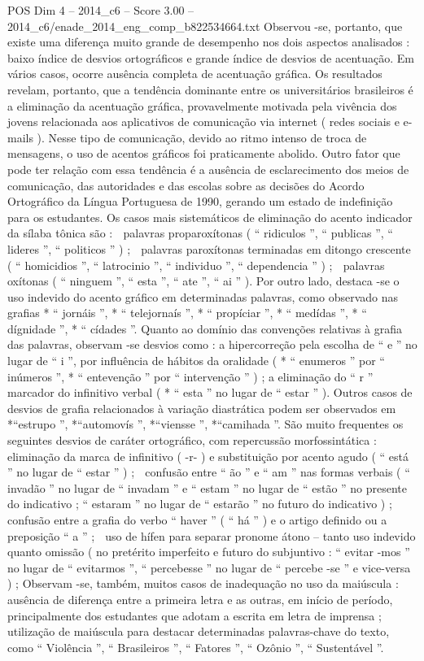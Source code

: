 \begin{textsample}{POS Dim 4 – 2014\_c6 – Score 3.00 – 2014\_c6/enade\_2014\_eng\_comp\_b822534664.txt}
Observou -se, portanto, que existe uma diferença muito grande de desempenho nos dois aspectos analisados : baixo índice de desvios ortográficos e grande índice de desvios de acentuação.
Em vários casos, ocorre ausência completa de acentuação gráfica.
Os resultados revelam, portanto, que a tendência dominante entre os universitários brasileiros é a eliminação da acentuação gráfica, provavelmente motivada pela vivência dos jovens relacionada aos aplicativos de comunicação via internet ( redes sociais e e-mails ).
Nesse tipo de comunicação, devido ao ritmo intenso de troca de mensagens, o uso de acentos gráficos foi praticamente abolido.
Outro fator que pode ter relação com essa tendência é a ausência de esclarecimento dos meios de comunicação, das autoridades e das escolas sobre as decisões do Acordo Ortográfico da Língua Portuguesa de 1990, gerando um estado de indefinição para os estudantes.
Os casos mais sistemáticos de eliminação do acento indicador da sílaba tônica são :  palavras proparoxítonas ( “ ridiculos ”, “ publicas ”, “ lideres ”, “ politicos ” ) ;  palavras paroxítonas terminadas em ditongo crescente ( “ homicidios ”, “ latrocinio ”, “ individuo ”, “ dependencia ” ) ;  palavras oxítonas ( “ ninguem ”, “ esta ”, “ ate ”, “ ai ” ).
Por outro lado, destaca -se o uso indevido do acento gráfico em determinadas palavras, como observado nas grafias * “ jornáis ”, * “ telejornaís ”, * “ propíciar ”, * “ medídas ”, * “ dígnidade ”, * “ cídades ”.
Quanto ao domínio das convenções relativas à grafia das palavras, observam -se desvios como : a hipercorreção pela escolha de “ e ” no lugar de “ i ”, por influência de hábitos da oralidade ( * “ enumeros ” por “ inúmeros ”, * “ entevenção ” por “ intervenção ” ) ; a eliminação do “ r ” marcador do infinitivo verbal ( * “ esta ” no lugar de “ estar ” ).
Outros casos de desvios de grafia relacionados à variação diastrática podem ser observados em *“estrupo ”, *“automovís ”, *“viensse ”, *“camihada ”.
São muito frequentes os seguintes desvios de caráter ortográfico, com repercussão morfossintática :  eliminação da marca de infinitivo ( -r- ) e substituição por acento agudo ( “ está ” no lugar de “ estar ” ) ;  confusão entre “ ão ” e “ am ” nas formas verbais ( “ invadão ” no lugar de “ invadam ” e “ estam ” no lugar de “ estão ” no presente do indicativo ; “ estaram ” no lugar de “ estarão ” no futuro do indicativo ) ;  confusão entre a grafia do verbo “ haver ” ( “ há ” ) e o artigo definido ou a preposição “ a ” ;  uso de hífen para separar pronome átono – tanto uso indevido quanto omissão ( no pretérito imperfeito e futuro do subjuntivo : “ evitar -mos ” no lugar de “ evitarmos ”, “ percebesse ” no lugar de “ percebe -se ” e vice-versa ) ; Observam -se, também, muitos casos de inadequação no uso da maiúscula : ausência de diferença entre a primeira letra e as outras, em início de período, principalmente dos estudantes que adotam a escrita em letra de imprensa ; utilização de maiúscula para destacar determinadas palavras-chave do texto, como “ Violência ”, “ Brasileiros ”, “ Fatores ”, “ Ozônio ”, “ Sustentável ”.

\end{textsample}
